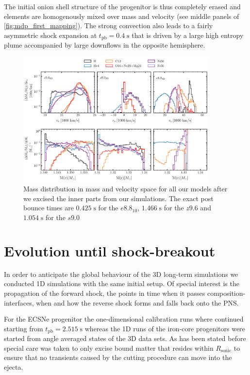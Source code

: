 \documentclass[fleqn,usenatbib]{mnras}
\begin{document}
The initial onion shell structure of the progenitor is thus completely erased and elements are homogenously mixed over mass and velocity (see middle panels of \autoref{fig:mdp_first_mapping}).
The strong convection also leads to a fairly asymmetric shock expansion at $t_{\mathrm{pb}}=0.4\;\mathrm{s}$ that is driven by a large high entropy plume accompanied by large downflows in the opposite hemisphere. 

\begin{figure}
 \centering
 \includegraphics[width=0.9\textwidth]{pic/z96_s9_e8_3d_massDis_mvr_and_masstime_0.pdf}
 \caption{Mass distribution in mass and velocity space for all our models after we excised the inner parts from our simulations. The exact post bounce times are $0.425 \;\mathrm{s}$ for the $e8.8_{10}$, $1.466 \;\mathrm{s}$ for the $z9.6$ and $1.054 \;\mathrm{s}$ for the $s9.0$ }
 \label{fig:mdp_first_mapping}
\end{figure}

\section{Evolution until shock-breakout}
In order to anticipate the global behaviour of the 3D long-term simulations we conducted 1D simulations with the same initial setup. Of special interest is the propagation of the forward shock, the points in time when it passes composition-interfaces, when and how the reverse shock forms and falls back onto the PNS.

For the ECSNe progenitor the one-dimensional calibration runs where continued starting from $t_{\mathrm{pb}} = 2.515 \;\mathrm{s}$ whereas the 1D runs of the iron-core progenitors were started from angle averaged states of the 3D data sets. 
As has been stated before special care was taken to only excise bound matter that resides within $R_{\mathrm{sonic}}$
to ensure that no transients caused by the cutting procedure can move into the ejecta.
\end{document}
